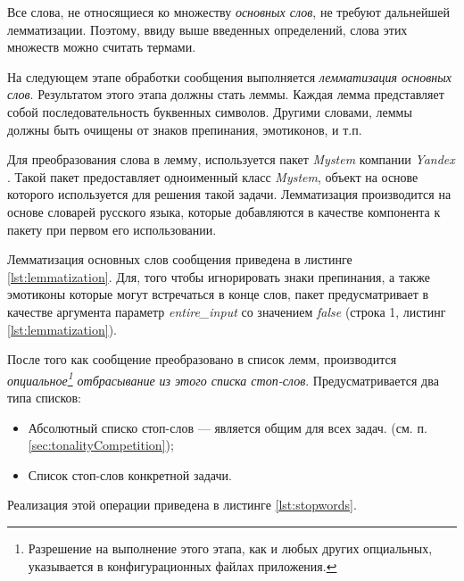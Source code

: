     Все слова, не относящиеся ко множеству {\it основных слов}, не требуют
    дальнейшей лемматизации. Поэтому, ввиду выше введенных определений, слова
    этих множеств можно считать термами.

    На следующем этапе обработки сообщения выполняется {\it лемматизация основных слов}.
    Результатом этого этапа должны стать леммы.
    Каждая лемма представляет собой последовательность буквенных символов.
    Другими словами, леммы должны быть очищены от знаков препинания, эмотиконов,
    и т.п.

    Для преобразования слова в лемму, используется пакет {\it Mystem} компании
    {\it Yandex} \cite{mystem}.
    Такой пакет предоставляет одноименный класс {\it Mystem}, объект на основе
    которого используется для решения такой задачи.
    Лемматизация производится на основе словарей русского языка, которые
    добавляются в качестве компонента к пакету при первом его использовании.

    Лемматизация основных слов сообщения приведена в листинге \ref{lst:lemmatization}.
    Для, того чтобы игнорировать знаки препинания, а также эмотиконы которые
    могут встречаться в конце слов, пакет предусматривает в качестве аргумента
    параметр {\it entire\_input} со значением {\it false} (строка 1, листинг
    \ref{lst:lemmatization}).

    \lstset{style=python}
    

    После того как сообщение преобразовано в список лемм, производится
    {\it опциальное\footnote{
            Разрешение на выполнение этого этапа, как и любых других опциальных,
            указывается в конфигурационных файлах приложения.
        }
    отбрасывание из этого списка стоп-слов}.
    Предусматривается два типа списков:
    \begin{itemize}
        \item Абсолютный списко стоп-слов --- является общим для всех задач.
            (см. п. \ref{sec:tonalityCompetition});
        \item Список стоп-слов конкретной задачи.
    \end{itemize}

    Реализация этой операции приведена в листинге \ref{lst:stopwords}.
    \lstset{style=python}
    

